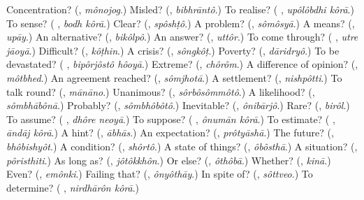 \begin{tcolorbox}[breakable,colback=teal!4,colframe=teal!35!black,title={Before you move on}]
Concentration? (\textbf{}, \emph{mônojog}.) Misled? (\textbf{}, \emph{bibhrāntô}.) To realise? (\textbf{ }, \emph{upôlôbdhi kôrā}.) To sense? (\textbf{ }, \emph{bodh kôrā}.) Clear? (\textbf{}, \emph{spôshṭô}.) A problem? (\textbf{}, \emph{sômôsyā}.) A means? (\textbf{}, \emph{upāy}.) An alternative? (\textbf{}, \emph{bikôlpô}.) An answer? (\textbf{}, \emph{uttôr}.) To come through? (\textbf{ }, \emph{utre jāoyā}.) Difficult? (\textbf{}, \emph{kôṭhin}.) A crisis? (\textbf{}, \emph{sôngkôṭ}.) Poverty? (\textbf{}, \emph{dāridryô}.) To be devastated? (\textbf{ }, \emph{bipôrjôstô hôoyā}.) Extreme? (\textbf{}, \emph{chôrôm}.) A difference of opinion? (\textbf{}, \emph{môtbhed}.) An agreement reached? (\textbf{}, \emph{sômjhotā}.) A settlement? (\textbf{}, \emph{nishpôtti}.) To talk round? (\textbf{}, \emph{mānāno}.) Unanimous? (\textbf{}, \emph{sôrbôsômmôtô}.) A likelihood? (\textbf{}, \emph{sômbhābônā}.) Probably? (\textbf{}, \emph{sômbhôbôtô}.) Inevitable? (\textbf{}, \emph{ônibārjô}.) Rare? (\textbf{}, \emph{birôl}.) To assume? (\textbf{ }, \emph{dhôre neoyā}.) To suppose? (\textbf{ }, \emph{ônumān kôrā}.) To estimate? (\textbf{ }, \emph{āndāj kôrā}.) A hint? (\textbf{}, \emph{ābhās}.) An expectation? (\textbf{}, \emph{prôtyāshā}.) The future? (\textbf{}, \emph{bhôbishyôt}.) A condition? (\textbf{}, \emph{shôrtô}.) A state of things? (\textbf{}, \emph{ôbôsthā}.) A situation? (\textbf{}, \emph{pôristhiti}.) As long as? (\textbf{}, \emph{jôtôkkhôn}.) Or else? (\textbf{}, \emph{ôthôbā}.) Whether? (\textbf{}, \emph{kinā}.) Even? (\textbf{}, \emph{emônki}.) Failing that? (\textbf{}, \emph{ônyôthāy}.) In spite of? (\textbf{}, \emph{sôttveo}.) To determine? (\textbf{ }, \emph{nirdhārôn kôrā}.)
\end{tcolorbox}
